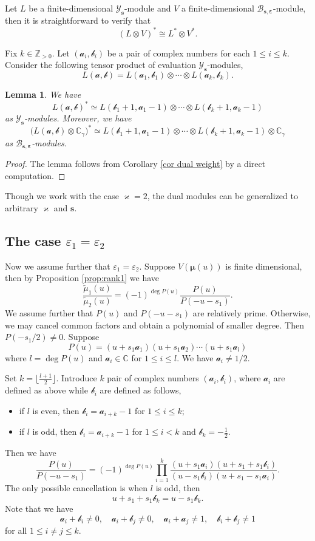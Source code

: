 \documentclass[11pt,reqno]{amsart}
\numberwithin{equation}{section}
\newtheorem{lem}[thm]{Lemma}
\theoremstyle{definition}
\theoremstyle{remark}
\newcommand{\beq}{\begin{equation}}
\newcommand{\eeq}{\end{equation}}
\newcommand{\C}{\mathbb{C}}
\newcommand{\mc}{\mathcal}
\newcommand{\bZ}{\mathbb{Z}}
\newcommand{\tl}{\tilde}
\newcommand{\lle}{\leqslant}
\newcommand{\YMN}{{\mathscr{Y}_{\bm s}}}
\newcommand{\BMN}{{\mathscr{B}_{\bm s,\bm \ve}}}
\newcommand{\ka}{\varkappa}
\newcommand{\ve}{\varepsilon}
\newcommand{\s}{{\bm s}}
\begin{document}
Let $L$ be a finite-dimensional $\YMN$-module and $V$ a finite-dimensional $\BMN$-module, then it is straightforward to verify that
\[
(L\otimes V)^*\cong L^*\otimes V^*.
\]

Fix $k\in\bZ_{>0}$. Let $(\mc a_i,\mc b_i)$ be a pair of complex numbers for each $1\lle i\lle k$. Consider the following tensor product of evaluation $\YMN$-modules,
\[
L(\bm{\mc a,\mc b})=L(\mc a_1,\mc b_1)\otimes \cdots\otimes L(\mc a_k,\mc b_k).
\]
\begin{lem}\label{lem:dual}
We have
\[
L(\bm{\mc a,\mc b})^*\simeq L(\mc b_1+1,\mc a_1-1)\otimes \cdots\otimes L(\mc b_k+1,\mc a_k-1)
\]
as $\YMN$-modules. Moreover, we have
\[
\big(L(\bm{\mc a,\mc b})\otimes \C_{\gamma}\big)^*\simeq L(\mc b_1+1,\mc a_1-1)\otimes \cdots\otimes L(\mc b_k+1,\mc a_k-1)\otimes \C_{\gamma}
\]
as $\BMN$-modules.
\end{lem}
\begin{proof}
The lemma follows from Corollary \ref{cor dual weight} by a direct computation.
\end{proof}

Though we work with the case $\ka=2$, the dual modules can be generalized to arbitrary $\ka$ and $\s$.

\subsection{The case $\ve_1=\ve_2$}
Now we assume further that $\ve_1=\ve_2$. Suppose $V(\bm\mu(u))$ is finite dimensional, then by Proposition \ref{prop:rank1} we have
\beq\label{P-def}
\frac{\tl \mu_1(u)}{\tl \mu_2(u)}=(-1)^{\deg P(u)}\frac{P(u)}{P(-u-s_1)}.
\eeq
We assume further that $P(u)$ and $P(-u-s_1)$ are relatively prime. Otherwise, we may cancel common factors and obtain a polynomial of smaller degree. Then $P(-s_1/2)\ne 0$. Suppose
\[
P(u)=(u+s_1\mc a_1)(u+s_1\mc a_2)\cdots (u+s_1\mc a_{l})
\]
where $l=\deg P(u)$ and $\mc a_i\in\C$ for $1\lle i\lle l$. We have $\mc a_i\ne 1/2$.

Set $k=\lfloor\frac{l+1}{2} \rfloor$. Introduce $k$ pair of complex numbers $(\mc a_i,\mc b_i)$, where $\mc a_i$ are defined as above while $\mc b_i$ are defined as follows,
\begin{itemize}
    \item if $l$ is even, then $\mc b_i=\mc a_{i+k}-1$ for $1\lle i\lle k$;
    \item if $l$ is odd, then $\mc b_i=\mc a_{i+k}-1$ for $1\lle i< k$ and $\mc b_k=-\frac{1}{2}$.
\end{itemize}
Then we have
\beq\label{P-factor}
\frac{P(u)}{P(-u-s_1)}=(-1)^{\deg P(u)}\prod_{i=1}^k\frac{(u+s_1\mc a_i)(u+s_1+s_1\mc b_i)}{(u-s_1\mc b_i)(u+s_1-s_1\mc a_i)}.
\eeq
The only possible cancellation is when $l$ is odd, then
\[
u+s_1+s_1\mc b_k=u-s_1\mc b_k.
\]
Note that we have
\beq\label{notequalto}
\mc a_i+\mc b_i\ne 0,\quad \mc a_i+\mc b_j\ne 0, \quad \mc a_i+\mc a_j\ne 1,\quad \mc b_i+\mc b_j\ne 1
\eeq
for all $1\lle i\ne j\lle k$.
\end{document}
